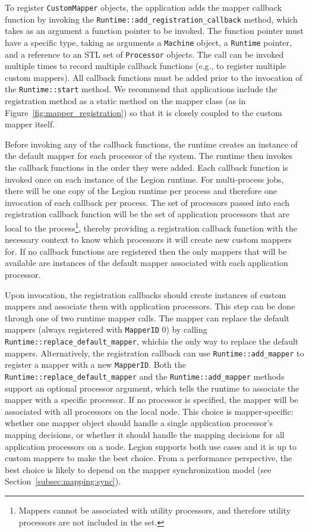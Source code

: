 To register {\tt CustomMapper} objects, the
application adds the mapper callback function by invoking the
{\tt Runtime::add\_registration\_callback} method, which takes as an
argument a function pointer to be invoked. The function pointer must
have a specific type, taking as arguments a {\tt Machine} object, 
a {\tt Runtime} pointer, and a reference to an STL set of {\tt Processor}
objects. The call can be invoked multiple times to record multiple
callback functions (e.g., to register multiple custom mappers). All
callback functions must be added prior to the invocation of the 
{\tt Runtime::start} method. We recommend that applications include the registration
method as a static method on the mapper class (as in Figure~\ref{fig:mapper_registration})
so that it is closely coupled to the custom mapper itself.

Before invoking any of the callback functions, the runtime 
creates an instance of the default mapper for each processor of
the system. The runtime then invokes the callback functions in the order
they were added. Each callback function is invoked once on each 
instance of the Legion runtime. For multi-process jobs, there will be 
one copy of the Legion runtime per process and therefore one invocation
of each callback per process. The set of processors passed into each 
registration callback function will be the set of application processors 
that are local to the process\footnote{Mappers cannot be associated with
utility processors, and therefore utility processors are not included
in the set.}, thereby providing a registration callback
function with the necessary context to know which processors it
will create new custom mappers for. 
If no callback functions are registered then the only mappers
that will be available are instances of the default mapper associated
with each application processor.

Upon invocation, the registration callbacks should create instances
of custom mappers and associate them with application processors. 
This step can be done through one of two runtime mapper calls. The mapper
can replace the default mappers (always registered with {\tt MapperID}
0) by calling {\tt Runtime::replace\_default\_mapper}, whichis the
only way to replace the default mappers. Alternatively, the registration
callback can use {\tt Runtime::add\_mapper} to register a mapper with a
new {\tt MapperID}. Both the {\tt Runtime::replace\_default\_mapper} and
the {\tt Runtime::add\_mapper} methods support an optional processor
argument, which tells the runtime to associate the mapper with a specific
processor. If no processor is specified, the mapper will be associated 
with all processors on the local node. This choice is mapper-specific:
whether one mapper object should handle a single application processor's
mapping decisions, or whether it should handle the mapping decisions for
all application processors on a node. Legion supports both use cases
and it is up to custom mappers to make the best choice. From a performance
perspective, the best choice is likely to depend on the mapper synchronization
model (see Section~\ref{subsec:mapping:sync}).

